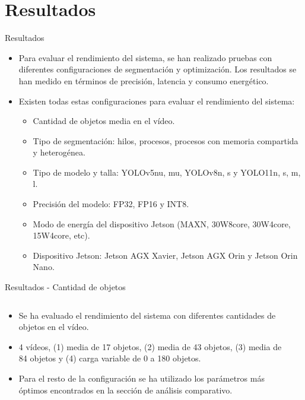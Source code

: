 \documentclass[spanish]{beamer}
\begin{document}
\section{Resultados}
\begin{frame}{Resultados}
    \begin{itemize}
        \item Para evaluar el rendimiento del sistema, se han realizado pruebas con diferentes configuraciones de segmentación y optimización. Los resultados se han medido en términos de precisión, latencia y consumo energético.
        \item Existen todas estas configuraciones para evaluar el rendimiento del sistema:
        \begin{itemize}
            \item Cantidad de objetos media en el vídeo.
            \item Tipo de segmentación: hilos, procesos, procesos con memoria compartida y heterogénea.
            \item Tipo de modelo y talla: YOLOv5{nu, mu}, YOLOv8{n, s} y YOLO11{n, s, m, l}.
            \item Precisión del modelo: FP32, FP16 y INT8.
            \item Modo de energía del dispositivo Jetson (MAXN, 30W8core, 30W4core, 15W4core, etc). 
            \item Dispositivo Jetson: Jetson AGX Xavier, Jetson AGX Orin y Jetson Orin Nano.
    \end{itemize}
    \end{itemize}
\end{frame}

\begin{frame}{Resultados - Cantidad de objetos}
    \begin{columns}
        \begin{column}{0.5\textwidth}
            \begin{itemize}
                \item Se ha evaluado el rendimiento del sistema con diferentes cantidades de objetos en el vídeo.
                \item 4 vídeos, (1) media de 17 objetos, (2) media de 43 objetos, (3) media de 84 objetos y (4) carga variable de 0 a 180 objetos.
                \item Para el resto de la configuración se ha utilizado los parámetros más óptimos encontrados en la sección de análisis comparativo.
            \end{itemize}
        \end{column}
        \begin{column}{0.5\textwidth}
        \end{column}
    \end{columns}
\end{frame}
\end{document}
